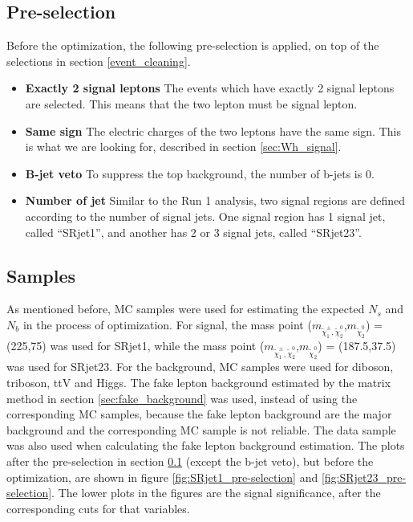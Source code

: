 \subsection{Pre-selection}
\label{sec:SR_pre-selection}
Before the optimization, the following pre-selection is applied, on top of the selections in section \ref{event_cleaning}.
\begin{itemize}
\item \textbf{Exactly 2 signal leptons} The events which have exactly 2 signal leptons are selected. This means that the two lepton must be signal lepton.
\item \textbf{Same sign} The electric charges of the two leptons have the same sign. This is what we are looking for, described in section \ref{sec:Wh_signal}.
\item \textbf{B-jet veto} To suppress the top background, the number of b-jets is 0.
\item \textbf{Number of jet} Similar to the Run 1 analysis, two signal regions are defined according to the number of signal jets. One signal region has 1 signal jet, called ``SRjet1'', and another has 2 or 3 signal jets, called ``SRjet23''.
\end{itemize}

\subsection{Samples}
As mentioned before, MC samples were used for estimating the expected $N_s$ and $N_b$ in the process of optimization.
For signal, the mass point ($m_{\tilde{\chi}_1^\pm , \tilde{\chi}_2^0}$,$m_{\tilde{\chi}_2^0}$) = (225,75) was used for SRjet1, while the mass point ($m_{\tilde{\chi}_1^\pm , \tilde{\chi}_2^0}$,$m_{\tilde{\chi}_2^0}$) = (187.5,37.5) was used for SRjet23.
For the background, MC samples were used for diboson, triboson, ttV and Higgs.
The fake lepton background estimated by the matrix method in section \ref{sec:fake_background} was used, instead of using the corresponding MC samples, because the fake lepton background are the major background and the corresponding MC sample is not reliable.
The data sample was also used when calculating the fake lepton background estimation.
The plots after the pre-selection in section \ref{sec:SR_pre-selection} (except the b-jet veto), but before the optimization, are shown in figure \ref{fig:SRjet1_pre-selection} and \ref{fig:SRjet23_pre-selection}. The lower plots in the figures are the signal significance, after the corresponding cuts for that variables.

